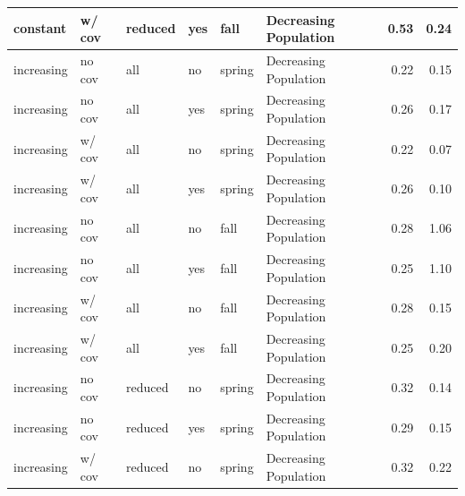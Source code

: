 \documentclass[
  12pt,
]{article}
\begin{document}
\begin{table}
\begin{tabular}{l|l|l|l|l|l|r|r}
\hline
\hspace{1em}\hspace{1em}constant & w/ cov & reduced & yes & fall & Decreasing Population & 0.53 & 0.24\\
\hline
\hspace{1em}\hspace{1em}increasing & no cov & all & no & spring & Decreasing Population & 0.22 & 0.15\\
\hline
\hspace{1em}\hspace{1em}increasing & no cov & all & yes & spring & Decreasing Population & 0.26 & 0.17\\
\hline
\hspace{1em}\hspace{1em}increasing & w/ cov & all & no & spring & Decreasing Population & 0.22 & 0.07\\
\hline
\hspace{1em}\hspace{1em}increasing & w/ cov & all & yes & spring & Decreasing Population & 0.26 & 0.10\\
\hline
\hspace{1em}\hspace{1em}increasing & no cov & all & no & fall & Decreasing Population & 0.28 & 1.06\\
\hline
\hspace{1em}\hspace{1em}increasing & no cov & all & yes & fall & Decreasing Population & 0.25 & 1.10\\
\hline
\hspace{1em}\hspace{1em}increasing & w/ cov & all & no & fall & Decreasing Population & 0.28 & 0.15\\
\hline
\hspace{1em}\hspace{1em}increasing & w/ cov & all & yes & fall & Decreasing Population & 0.25 & 0.20\\
\hline
\hspace{1em}\hspace{1em}increasing & no cov & reduced & no & spring & Decreasing Population & 0.32 & 0.14\\
\hline
\hspace{1em}\hspace{1em}increasing & no cov & reduced & yes & spring & Decreasing Population & 0.29 & 0.15\\
\hline
\hspace{1em}\hspace{1em}increasing & w/ cov & reduced & no & spring & Decreasing Population & 0.32 & 0.22\\

\end{tabular}
\end{table}
\end{document}

